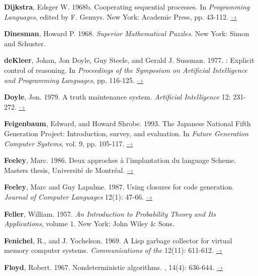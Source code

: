  \label{Dijkstra 1968b}
\textbf{Dijkstra}, Edsger W. 1968b.  Cooperating sequential processes.  In
\textit{Programming Languages}, edited by F. Genuys. New York: Academic Press,
pp.  43-112.
\href{http://www.cs.utexas.edu/users/EWD/ewd01xx/EWD123.PDF}{–›}

 \label{Dinesman 1968}
\textbf{Dinesman}, Howard P.  1968.  \textit{Superior Mathematical Puzzles}.  New York:
Simon and Schuster.

 \label{deKleer et al. 1977}
\textbf{deKleer}, Johan, Jon Doyle, Guy Steele, and Gerald J. Sussman.  1977.
: Explicit control of reasoning.  In \textit{Proceedings of the
 Symposium on Artificial Intelligence and Programming Languages},
pp.  116-125.
\href{http://dspace.mit.edu/handle/1721.1/5750}{–›}

 \label{Doyle (1979)}
\textbf{Doyle}, Jon. 1979. A truth maintenance system. \textit{Artificial Intelligence}
12: 231-272.
\href{http://dspace.mit.edu/handle/1721.1/5733}{–›}

 \label{Feigenbaum and Shrobe 1993}
\textbf{Feigenbaum}, Edward, and Howard Shrobe. 1993. The Japanese National Fifth
Generation Project: Introduction, survey, and evaluation.  In \textit{Future
Generation Computer Systems}, vol. 9, pp. 105-117.
\href{https://saltworks.stanford.edu/assets/kv359wz9060.pdf}{–›}

 \label{Feeley (1986)}
\textbf{Feeley}, Marc.  1986.  Deux approches \`a l'implantation du language
Scheme.  Masters thesis, Universit\'e de Montr\'eal.
\href{http://www.iro.umontreal.ca/~feeley/papers/FeeleyMSc.pdf}{–›}

 \label{Feeley and Lapalme 1987}
\textbf{Feeley}, Marc and Guy Lapalme.  1987.  Using closures for code generation.
\textit{Journal of Computer Languages} 12(1): 47-66.
\href{http://citeseerx.ist.psu.edu/viewdoc/summary?doi=10.1.1.90.6978}{–›}

\textbf{Feller}, William.  1957.  \textit{An Introduction to Probability Theory and Its
Applications}, volume 1. New York: John Wiley \& Sons.

 \label{Fenichel and Yochelson (1969)}
\textbf{Fenichel}, R., and J. Yochelson.  1969.  A Lisp garbage collector for virtual
memory computer systems.  \textit{Communications of the }
12(11): 611-612.
\href{https://www.cs.purdue.edu/homes/hosking/690M/p611-fenichel.pdf}{–›}

 \label{Floyd (1967)}
\textbf{Floyd}, Robert. 1967. Nondeterministic algorithms. \textit{},
14(4): 636-644.
\href{http://citeseerx.ist.psu.edu/viewdoc/summary?doi=10.1.1.332.36}{–›}

